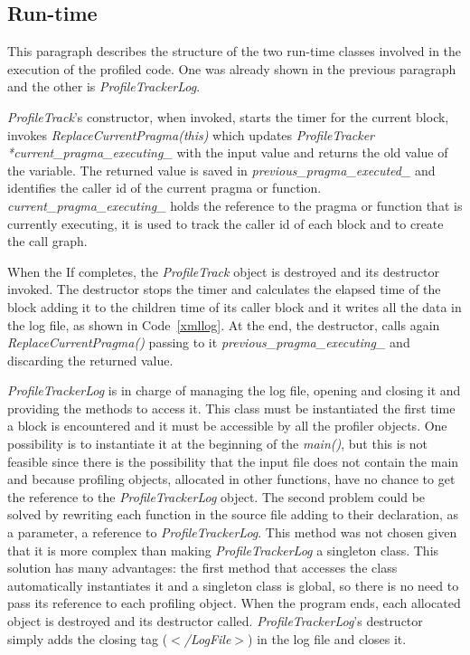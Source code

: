 \documentclass[a4paper,11pt,oneside]{book}
\begin{document}
\subsection{Run-time}
\label{profilerun}

This paragraph describes the structure of the two run-time classes involved in the execution of the profiled code. One was already shown in the previous paragraph and the other is \emph{ProfileTrackerLog}. 

\emph{ProfileTrack}’s constructor, when invoked, starts the timer for the current block, invokes \emph{ReplaceCurrentPragma(this)} which updates \emph{ProfileTracker *current\_pragma\_executing\_} with the input value and returns the old value of the variable. The returned value is saved in \emph{previous\_pragma\_executed\_} and identifies the caller id of the current pragma or function. \emph{current\_pragma\_executing\_} holds the reference to the pragma or function that is currently executing, it is used to track the caller id of each block and to create the call graph. 

When the If completes, the \emph{ProfileTrack} object is destroyed and its destructor invoked. The destructor stops the timer and calculates the elapsed time of the block adding it to the children time of its caller block and it writes all the data in the log file, as shown in Code~\ref{xmllog}. At the end, the destructor, calls again \emph{ReplaceCurrentPragma()} passing to it \emph{previous\_pragma\_executing\_} and discarding the returned value.

\emph{ProfileTrackerLog} is in charge of managing the log file, opening and closing it and providing the methods to access it. This class must be instantiated the first time a block is encountered and it must be accessible by all the profiler objects. One possibility is to instantiate it at the beginning of the \emph{main()}, but this is not feasible since there is the possibility that the input file does not contain the main and because profiling objects, allocated in other functions, have no chance to get the reference to the \emph{ProfileTrackerLog} object. The second problem could be solved by rewriting each function in the source file adding to their declaration, as a parameter, a reference to \emph{ProfileTrackerLog}. This method was not chosen given that it is more complex than making \emph{ProfileTrackerLog} a singleton class. This solution has many advantages: the first method that accesses the class automatically instantiates it and a singleton class is global, so there is no need to pass its reference to each profiling object. When the program ends, each allocated object is destroyed and its destructor called. \emph{ProfileTrackerLog}'s destructor simply adds the closing tag (\emph{$<$/LogFile$>$}) in the log file and closes it.
\end{document}
